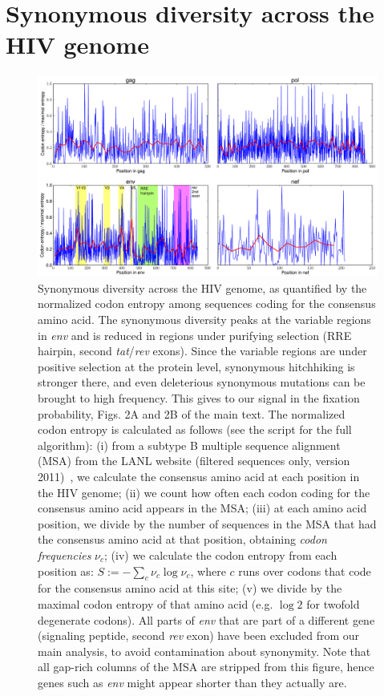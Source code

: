 \documentclass[rmp]{revtex4}
\begin{document}
\section{Synonymous diversity across the HIV genome}
\begin{figure}[h]
\begin{center}
\includegraphics[width=\linewidth]{conservation_codons_genome}
\caption{
Synonymous diversity across the HIV genome, as quantified by the normalized
codon entropy among sequences coding for the consensus amino acid. The
synonymous diversity peaks at the variable regions in {\it env} and is reduced
in regions under purifying selection (RRE hairpin, second {\it tat}/{\it rev}
exons). Since the variable regions are under positive selection at the protein
level, synonymous hitchhiking is stronger there, and even deleterious synonymous
mutations can be brought to high frequency. This gives to our signal in the
fixation probability, Figs. 2A and 2B of the main text. The normalized codon
entropy is calculated as follows (see the script for the full algorithm): (i)
from a subtype B multiple sequence alignment (MSA) from the LANL website
(filtered sequences only, version 2011)~\cite{LANL2012}, we calculate the
consensus amino acid at each position in the HIV genome; (ii) we count how often
each codon coding for the consensus amino acid appears in the MSA; (iii) at each
amino acid position, we divide by the number of sequences in the MSA that had
the consensus amino acid at that position, obtaining {\it codon frequencies}
$\nu_c$; (iv) we calculate the codon entropy from each position as: $S := -
\sum_{c} \nu_c \log \nu_c$, where $c$ runs over codons that code for the
consensus amino acid at this site; (v) we divide by the maximal codon entropy of
that amino acid (e.g. $\log 2$ for twofold degenerate codons). All parts of
{\it env} that are part of a different gene (signaling peptide, second {\it rev}
exon) have been excluded from our main analysis, to avoid contamination about
synonymity. Note that all gap-rich columns of the MSA are stripped from this
figure, hence genes such as {\it env} might appear shorter than they actually
are.
}
\label{fig:syndiv_genome}
\end{center}
\end{figure}
\end{document}
